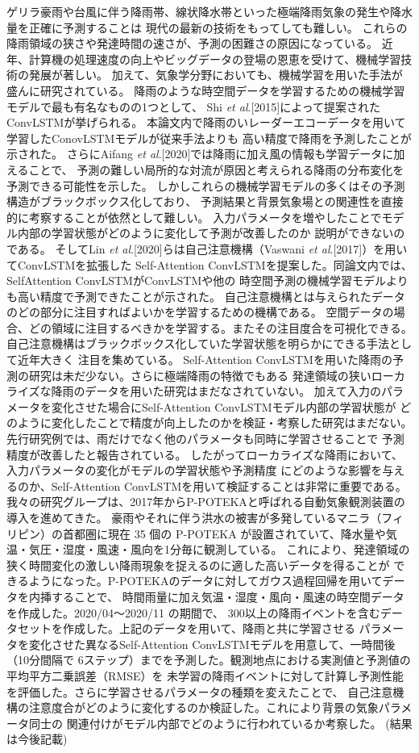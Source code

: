 ゲリラ豪雨や台風に伴う降雨帯、線状降水帯といった極端降雨気象の発生や降水量を正確に予測することは
現代の最新の技術をもってしても難しい。
これらの降雨領域の狭さや発達時間の速さが、予測の困難さの原因になっている。
近年、計算機の処理速度の向上やビッグデータの登場の恩恵を受けて、機械学習技術の発展が著しい。
加えて、気象学分野においても、機械学習を用いた手法が盛んに研究されている。
降雨のような時空間データを学習するための機械学習モデルで最も有名なものの1つとして、
Shi \textit{et al}.[2015]によって提案されたConvLSTMが挙げられる。
本論文内で降雨のいレーダーエコーデータを用いて学習したConovLSTMモデルが従来手法よりも
高い精度で降雨を予測したことが示された。
さらにAifang \textit{et al}.[2020]では降雨に加え風の情報も学習データに加えることで、
予測の難しい局所的な対流が原因と考えられる降雨の分布変化を予測できる可能性を示した。
しかしこれらの機械学習モデルの多くはその予測構造がブラックボックス化しており、
予測結果と背景気象場との関連性を直接的に考察することが依然として難しい。
入力パラメータを増やしたことでモデル内部の学習状態がどのように変化して予測が改善したのか
説明ができないのである。
そしてLin \textit{et al}.[2020]らは自己注意機構（Vaswani \textit{et al}.[2017]）を用いてConvLSTMを拡張した
Self-Attention ConvLSTMを提案した。同論文内では、SelfAttention ConvLSTMがConvLSTMや他の
時空間予測の機械学習モデルよりも高い精度で予測できたことが示された。
自己注意機構とは与えられたデータのどの部分に注目すればよいかを学習するための機構である。
空間データの場合、どの領域に注目するべきかを学習する。またその注目度合を可視化できる。
自己注意機構はブラックボックス化していた学習状態を明らかにできる手法として近年大きく
注目を集めている。
Self-Attention ConvLSTMを用いた降雨の予測の研究は未だ少ない。さらに極端降雨の特徴でもある
発達領域の狭いローカライズな降雨のデータを用いた研究はまだなされていない。
加えて入力のパラメータを変化させた場合にSelf-Attention ConvLSTMモデル内部の学習状態が
どのように変化したことで精度が向上したのかを検証・考察した研究はまだない。
先行研究例では、雨だけでなく他のパラメータも同時に学習させることで
予測精度が改善したと報告されている。
したがってローカライズな降雨において、入力パラメータの変化がモデルの学習状態や予測精度
にどのような影響を与えるのか、Self-Attention ConvLSTMを用いて検証することは非常に重要である。
我々の研究グループは、2017年からP-POTEKAと呼ばれる自動気象観測装置の導入を進めてきた。
豪雨やそれに伴う洪水の被害が多発しているマニラ（フィリピン）の首都圏に現在 35 個の
P-POTEKA が設置されていて、降水量や気温・気圧・湿度・風速・風向を1分毎に観測している。
これにより、発達領域の狭く時間変化の激しい降雨現象を捉えるのに適した高いデータを得ることが
できるようになった。P-POTEKAのデータに対してガウス過程回帰を用いてデータを内挿することで、
時間雨量に加え気温・湿度・風向・風速の時空間データを作成した。2020/04～2020/11 の期間で、
300以上の降雨イベントを含むデータセットを作成した。上記のデータを用いて、降雨と共に学習させる
パラメータを変化させた異なるSelf-Attention ConvLSTMモデルを用意して、一時間後（10分間隔で
6ステップ）までを予測した。観測地点における実測値と予測値の平均平方二乗誤差（RMSE）を
未学習の降雨イベントに対して計算し予測性能を評価した。さらに学習させるパラメータの種類を変えたことで、
自己注意機構の注意度合がどのように変化するのか検証した。これにより背景の気象パラメータ同士の
関連付けがモデル内部でどのように行われているか考察した。
(結果は今後記載)